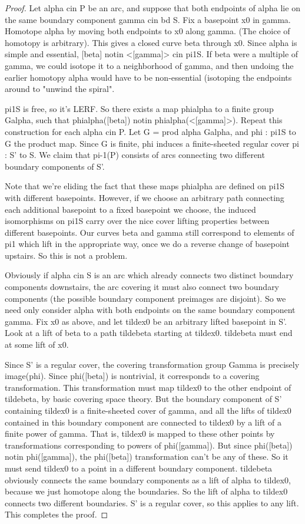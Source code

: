 \documentclass[12pt]{amsart}
\theoremstyle{definition}
\theoremstyle{remark}
\begin{document}
\begin{proof}

Let alpha cin P be an arc, and suppose that both endpoints of alpha lie on the
same boundary component gamma cin bd S. Fix a basepoint x0 in gamma.  Homotope
alpha by moving both endpoints to x0 along gamma. (The choice of homotopy is
arbitrary). This gives a closed curve beta through x0. Since alpha is simple
and essential, [beta] notin <[gamma]> cin pi1S. If beta were a multiple of
gamma, we could isotope it to a neighborhood of gamma, and then undoing the
earlier homotopy alpha would have to be non-essential (isotoping the endpoints
around to "unwind the spiral".

pi1S is free, so it's LERF. So there exists a map phialpha to a finite group
Galpha, such that phialpha([beta]) notin phialpha(<[gamma]>). Repeat this
construction for each alpha cin P. Let G = prod alpha Galpha, and phi : pi1S to
G the product map. Since G is finite, phi induces a finite-sheeted regular
cover pi : S' to S. We claim that pi-1(P) consists of arcs connecting two
different boundary components of S'.

Note that we're eliding the fact that these maps phialpha are defined on pi1S
with different basepoints. However, if we choose an arbitrary path connecting
each additional basepoint to a fixed basepoint we choose, the induced
isomorphisms on pi1S carry over the nice cover lifting properties between
different basepoints. Our curves beta and gamma still correspond to elements of
pi1 which lift in the appropriate way, once we do a reverse change of basepoint
upstairs. So this is not a problem.

Obviously if alpha cin S is an arc which already connects two distinct boundary
components downstairs, the arc covering it must also connect two boundary
components (the possible boundary component preimages are disjoint). So we need
only consider alpha with both endpoints on the same boundary component gamma.
Fix x0 as above, and let tildex0 be an arbitrary lifted basepoint in S'.  Look
at a lift of beta to a path tildebeta starting at tildex0. tildebeta must end
at some lift of x0.

Since S' is a regular cover, the covering transformation group Gamma is
precisely image(phi). Since phi([beta]) is nontrivial, it corresponds to
a covering transformation. This transformation must map tildex0 to the other
endpoint of tildebeta, by basic covering space theory. But the boundary
component of S' containing tildex0 is a finite-sheeted cover of gamma, and all
the lifts of tildex0 contained in this boundary component are connected to
tildex0 by a lift of a finite power of gamma. That is, tildex0 is mapped to
these other points by transformations corresponding to powers of phi([gamma]).
But since phi([beta]) notin phi([gamma]), the phi([beta]) transformation can't
be any of these. So it must send tildex0 to a point in a different boundary
component. tildebeta obviously connects the same boundary components as a lift
of alpha to tildex0, because we just homotope along the boundaries. So the lift
of alpha to tildex0 connects two different boundaries. S' is a regular cover,
so this applies to any lift. This completes the proof.


\end{proof}
\end{document}
